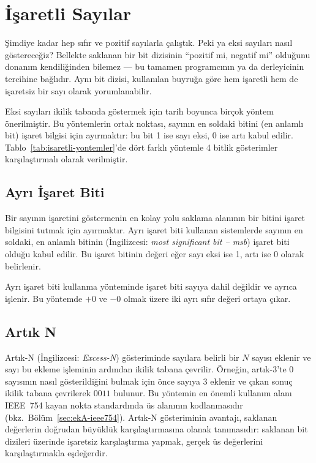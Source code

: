 \section{İşaretli Sayılar}
\label{sec:isaretli-sayilar}

Şimdiye kadar hep sıfır ve pozitif sayılarla çalıştık. Peki ya eksi sayıları nasıl göstereceğiz? Bellekte saklanan bir bit dizisinin ``pozitif mi, negatif mi'' olduğunu donanım kendiliğinden bilemez --- bu tamamen programcının ya da derleyicinin tercihine bağlıdır. Aynı bit dizisi, kullanılan buyruğa göre hem işaretli hem de işaretsiz bir sayı olarak yorumlanabilir.

Eksi sayıları ikilik tabanda göstermek için tarih boyunca birçok yöntem önerilmiştir. Bu yöntemlerin ortak noktası, sayının en soldaki bitini (en anlamlı bit) işaret bilgisi için ayırmaktır: bu bit 1 ise sayı eksi, 0 ise artı kabul edilir. Tablo~\ref{tab:isaretli-yontemler}'de dört farklı yöntemle 4 bitlik gösterimler karşılaştırmalı olarak verilmiştir.

\subsection{Ayrı İşaret Biti}

Bir sayının işaretini göstermenin en kolay yolu saklama alanının bir bitini işaret bilgisini tutmak için ayırmaktır. Ayrı işaret biti kullanan sistemlerde sayının en soldaki, en anlamlı bitinin (İngilizcesi: \textit{most significant bit -- msb}) işaret biti olduğu kabul edilir. Bu işaret bitinin değeri eğer sayı eksi ise 1, artı ise 0 olarak belirlenir.

Ayrı işaret biti kullanma yönteminde işaret biti sayıya dahil değildir ve ayrıca işlenir. Bu yöntemde $+0$ ve $-0$ olmak üzere iki ayrı sıfır değeri ortaya çıkar.

\subsection{Artık N}

Artık-N (İngilizcesi: \textit{Excess-N}) gösteriminde sayılara belirli bir $N$ sayısı eklenir ve sayı bu ekleme işleminin ardından ikilik tabana çevrilir. Örneğin, artık-3'te 0 sayısının nasıl gösterildiğini bulmak için önce sayıya 3 eklenir ve çıkan sonuç ikilik tabana çevrilerek $0011$ bulunur. Bu yöntemin en önemli kullanım alanı IEEE~754 kayan nokta standardında üs alanının kodlanmasıdır (bkz.\ Bölüm~\ref{sec:ekA-ieee754}). Artık-N gösteriminin avantajı, saklanan değerlerin doğrudan büyüklük karşılaştırmasına olanak tanımasıdır: saklanan bit dizileri üzerinde işaretsiz karşılaştırma yapmak, gerçek üs değerlerini karşılaştırmakla eşdeğerdir.

